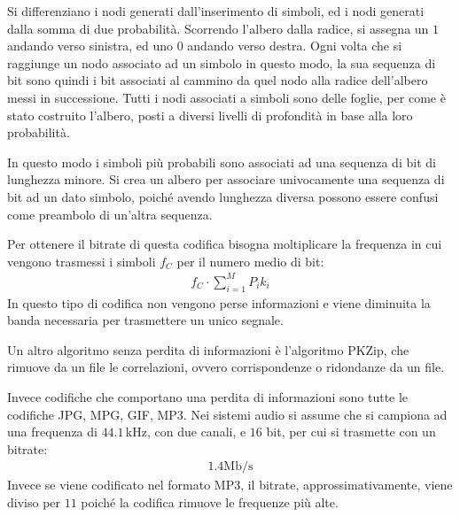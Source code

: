 \documentclass{article}
\numberwithin{equation}{subsection}
\begin{document}
Si differenziano i nodi generati dall'inserimento di simboli, ed i nodi generati dalla somma di due probabilità. Scorrendo l'albero dalla radice, si assegna un $1$ andando 
verso sinistra, ed uno $0$ andando verso destra. Ogni volta che si raggiunge un nodo associato ad un simbolo in questo modo, la sua sequenza di bit sono quindi i bit 
associati al cammino da quel nodo alla radice dell'albero messi in successione. 
Tutti i nodi associati a simboli sono delle foglie, per come è stato costruito l'albero, posti a diversi livelli di profondità in base alla loro probabilità. 

In questo modo i simboli più probabili sono associati ad una sequenza di bit di lunghezza minore. Si crea un albero per associare univocamente una sequenza di bit ad un 
dato simbolo, poiché avendo lunghezza diversa possono essere confusi come preambolo di un'altra sequenza. 


Per ottenere il bitrate di questa codifica bisogna moltiplicare la frequenza in cui vengono trasmessi i simboli $f_C$ per il numero medio di bit:
\begin{gather*}
    f_C\cdot\displaystyle\sum_{i=1}^MP_ik_i
\end{gather*}
In questo tipo di codifica non vengono perse informazioni e viene diminuita la banda necessaria per trasmettere un unico segnale. 


Un altro algoritmo senza perdita di informazioni è l'algoritmo PKZip, che rimuove da un file le correlazioni, ovvero corrispondenze o ridondanze da un file. 

Invece codifiche che comportano una perdita di informazioni sono tutte le codifiche JPG, MPG, GIF, MP3. 
Nei sistemi audio si assume che si campiona ad una frequenza di $44.1\,$kHz, con due canali, e $16$ bit, per cui si trasmette con un bitrate:
\begin{gather*}
    1.4\mathrm{Mb/s}
\end{gather*}
Invece se viene codificato nel formato MP3, il bitrate, approssimativamente, viene diviso per $11$ poiché la codifica rimuove le frequenze più alte. 
\end{document}
